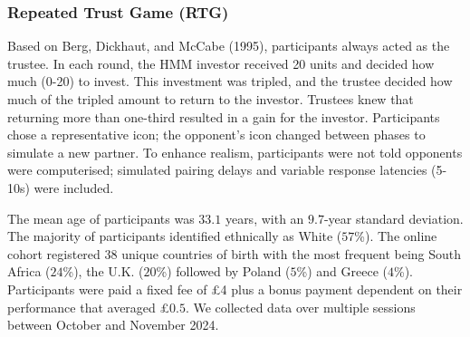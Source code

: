 \documentclass[
]{article}
\begin{document}
\subsubsection{Repeated Trust Game (RTG)}\label{repeated-trust-game-rtg}

Based on Berg, Dickhaut, and McCabe (1995), participants always acted as the trustee. In each round, the HMM investor received 20 units and decided how much (0-20) to invest. This investment was tripled, and the trustee decided how much of the tripled amount to return to the investor. Trustees knew that returning more than one-third resulted in a gain for the investor. Participants chose a representative icon; the opponent's icon changed between phases to simulate a new partner. To enhance realism, participants were not told opponents were computerised; simulated pairing delays and variable response latencies (5-10s) were included.

The mean age of participants was \(33.1\) years, with an \(9.7\)-year standard deviation. The majority of participants identified ethnically as White (\(57\)\%). The online cohort registered \(38\) unique countries of birth with the most frequent being South Africa (\(24\)\%), the U.K. (\(20\)\%) followed by Poland (\(5\)\%) and Greece (\(4\)\%). Participants were paid a fixed fee of £4 plus a bonus payment dependent on their performance that averaged £\(0.5\). We collected data over multiple sessions between October and November 2024.
\end{document}
